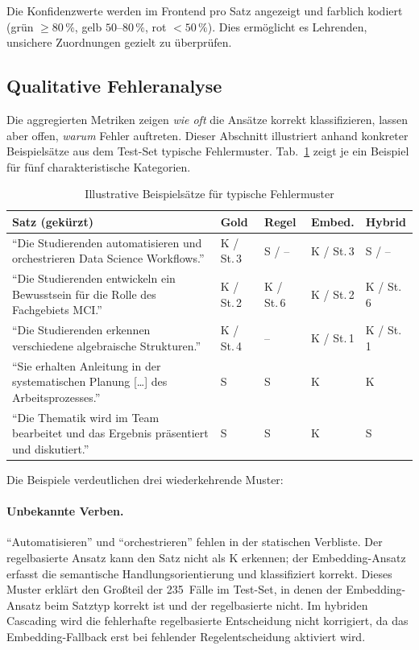 Die Konfidenzwerte werden im Frontend pro Satz angezeigt und farblich kodiert (grün $\geq 80\,\%$, gelb $50$--$80\,\%$, rot $< 50\,\%$).
Dies ermöglicht es Lehrenden, unsichere Zuordnungen gezielt zu überprüfen.

\subsection{Qualitative Fehleranalyse}\label{sec:eval-fehleranalyse}

Die aggregierten Metriken zeigen \emph{wie oft} die Ansätze korrekt klassifizieren, lassen aber offen, \emph{warum} Fehler auftreten.
Dieser Abschnitt illustriert anhand konkreter Beispielsätze aus dem Test-Set typische Fehlermuster.
Tab.~\ref{tab:eval-beispiele} zeigt je ein Beispiel für fünf charakteristische Kategorien.

\begin{table}[H]
\caption{Illustrative Beispielsätze für typische Fehlermuster\label{tab:eval-beispiele}}
\centering
\small
\begin{tabular}{p{}p{}p{}p{}p{}}
\hline
\textbf{Satz (gekürzt)} & \textbf{Gold} & \textbf{Regel} & \textbf{Embed.} & \textbf{Hybrid} \\
\hline
\enquote{Die Studierenden automatisieren und orchestrieren Data Science Workflows.}
  & K / St.\,3 & S / -- & K / St.\,3 & S / -- \\[4pt]
\enquote{Die Studierenden entwickeln ein Bewusstsein für die Rolle des Fachgebiets MCI.}
  & K / St.\,2 & K / St.\,6 & K / St.\,2 & K / St.\,6 \\[4pt]
\enquote{Die Studierenden erkennen verschiedene algebraische Strukturen.}
  & K / St.\,4 & -- & K / St.\,1 & K / St.\,1 \\[4pt]
\enquote{Sie erhalten Anleitung in der systematischen Planung [\ldots] des Arbeitsprozesses.}
  & S & S & K & K \\[4pt]
\enquote{Die Thematik wird im Team bearbeitet und das Ergebnis präsentiert und diskutiert.}
  & S & S & K & S \\
\hline
\end{tabular}
\end{table}

Die Beispiele verdeutlichen drei wiederkehrende Muster:

\paragraph{Unbekannte Verben.}
\enquote{Automatisieren} und \enquote{orchestrieren} fehlen in der statischen Verbliste.
Der regelbasierte Ansatz kann den Satz nicht als K erkennen; der Embedding-Ansatz erfasst die semantische Handlungsorientierung und klassifiziert korrekt.
Dieses Muster erklärt den Großteil der 235~Fälle im Test-Set, in denen der Embedding-Ansatz beim Satztyp korrekt ist und der regelbasierte nicht.
Im hybriden Cascading wird die fehlerhafte regelbasierte Entscheidung nicht korrigiert, da das Embedding-Fallback erst bei fehlender Regelentscheidung aktiviert wird.

